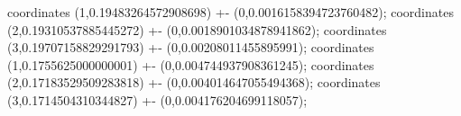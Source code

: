 coordinates {(1,0.19483264572908698) +- (0,0.0016158394723760482)};
coordinates {(2,0.19310537885445272) +- (0,0.0018901034878941862)};
coordinates {(3,0.19707158829291793) +- (0,0.00208011455895991)};
coordinates {(1,0.1755625000000001) +- (0,0.004744937908361245)};
coordinates {(2,0.17183529509283818) +- (0,0.004014647055494368)};
coordinates {(3,0.1714504310344827) +- (0,0.004176204699118057)};
